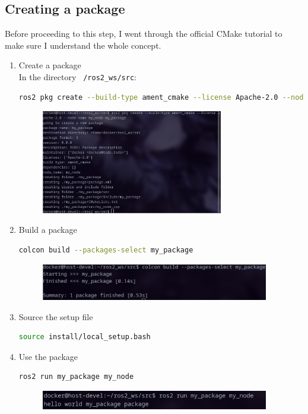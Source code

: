 \documentclass[12pt, a4paper]{article}
\begin{document}
\subsection{Creating a package}
Before proceeding to this step, I went through the official CMake tutorial to make sure I understand the whole concept.
\begin{enumerate}
	\item Create a package\\
		In the directory \texttt{~/ros2\_ws/src}:
\begin{lstlisting}[language=bash]
ros2 pkg create --build-type ament_cmake --license Apache-2.0 --node-name my_node my_package
\end{lstlisting}
\begin{figure}[h]
	\centering
	\includegraphics[width=0.75\textwidth]{2/p2.3-1}
\end{figure}
\item Build a package
\begin{lstlisting}[language=bash]
colcon build --packages-select my_package
\end{lstlisting}
\begin{figure}[h]
	\setlength{\leftskip}{2.4em}
	\includegraphics[width=0.94\textwidth]{2/p2.3-2}
\end{figure}
\item Source the setup file
\begin{lstlisting}[language=bash]
source install/local_setup.bash
\end{lstlisting}

\item Use the package
\begin{lstlisting}[language=bash]
ros2 run my_package my_node
\end{lstlisting}
\begin{figure}[h]
	\setlength{\leftskip}{2.4em}
	\includegraphics[width=0.94\textwidth]{2/p2.3-3}
\end{figure}


\end{enumerate}
\end{document}
